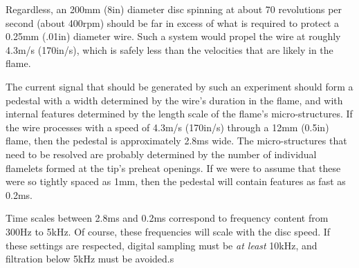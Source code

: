Regardless, an 200mm (8in) diameter disc spinning at about 70 revolutions per second (about 400rpm) should be far in excess of what is required to protect a 0.25mm (.01in) diameter wire.  Such a system would propel the wire at roughly 4.3m/s (170in/s), which is safely less than the velocities that are likely in the flame.  

The current signal that should be generated by such an experiment should form a pedestal with a width determined by the wire's duration in the flame, and with internal features determined by the length scale of the flame's micro-structures.  If the wire processes with a speed of 4.3m/s (170in/s) through a 12mm (0.5in) flame, then the pedestal is approximately 2.8ms wide.  The micro-structures that need to be resolved are probably determined by the number of individual flamelets formed at the tip's preheat openings.  If we were to assume that these were so tightly spaced as 1mm, then the pedestal will contain features as fast as 0.2ms.

Time scales between 2.8ms and 0.2ms correspond to frequency content from 300Hz to 5kHz.  Of course, these frequencies will scale with the disc speed.  If these settings are respected, digital sampling must be \emph{at least} 10kHz, and filtration below 5kHz must be avoided.s


